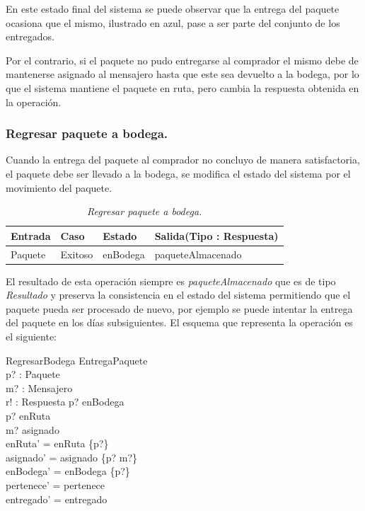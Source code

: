 \documentclass[12pt,a4paper,table]{article}
\begin{document}
En este estado final del sistema se puede observar que la entrega del paquete ocasiona que el mismo, ilustrado en azul, pase a ser parte del conjunto de los entregados.

\indent Por el contrario, si el paquete no pudo entregarse al comprador el mismo debe de mantenerse asignado al mensajero hasta que este sea devuelto a la bodega, por lo que el sistema mantiene el paquete en ruta, pero cambia la respuesta obtenida en la operación.

\subsubsection{Regresar paquete a bodega.}
Cuando la entrega del paquete al comprador no concluyo de manera satisfactoria, el paquete debe ser llevado a la bodega, se modifica el estado del sistema por el movimiento del paquete. 

\begin{table}[H]
\center
\makegapedcells
\begin{tabular}{||l|l|l|l||}
\hline
\textbf{Entrada} & \textbf{Caso} & \textbf{Estado} & \textbf{Salida(Tipo : Respuesta)} \\
\hline
\hline
{Paquete} & Exitoso & enBodega & paqueteAlmacenado \\
\hline 
\end{tabular}
\caption{\textit{Regresar paquete a bodega.}} \label{fig:M1}
\end{table}

El resultado de esta operación siempre es \textit{paqueteAlmacenado} que es de tipo \textit{Resultado} y preserva la consistencia en el estado del sistema permitiendo que el paquete pueda ser procesado de nuevo, por ejemplo se puede intentar la entrega del paquete en los días subsiguientes. El esquema que representa la operación es el siguiente:

\begin{schema}{RegresarBodega}
\Delta EntregaPaquete\\
p? : Paquete\\
m? : Mensajero\\
r! : Respuesta
\where
p? \notin enBodega\\
p? \in  enRuta\\
m? \in \ran asignado\\
enRuta' = enRuta \setminus \{p?\}\\
asignado' = asignado \setminus \{p? \mapsto m?\}\\
enBodega' = enBodega \cup \{p?\}\\
pertenece' = pertenece\\
entregado' = entregado
\end{schema}
\end{document}
